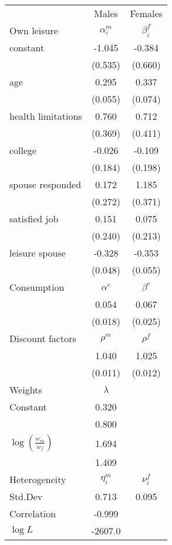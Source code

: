 \begin{tabular}{lcc} 
\hline\hline 
 & Males & Females \\ 
Own leisure & $\alpha_{i}^{m}$ & $\beta_{i}^{f}$ \\ 
constant & -1.045 & -0.384 \\ 
 & (0.535) & (0.660) \\ 
age & 0.295 & 0.337 \\ 
 & (0.055) & (0.074) \\ 
health limitations & 0.760 & 0.712 \\ 
 & (0.369) & (0.411) \\ 
college & -0.026 & -0.109 \\ 
 & (0.184) & (0.198) \\ 
spouse responded & 0.172 & 1.185 \\ 
 & (0.272) & (0.371) \\ 
satisfied job & 0.151 & 0.075 \\ 
 & (0.240) & (0.213) \\ 
leisure spouse & -0.328 & -0.353 \\ 
 & (0.048) & (0.055) \\ 
Consumption & $\alpha^{c}$ & $\beta^{c}$ \\ 
 & 0.054 & 0.067 \\ 
 & (0.018) & (0.025) \\ 
Discount factors & $\rho^m$ & $\rho^f$ \\ 
 & 1.040 & 1.025 \\ 
 & (0.011) & (0.012) \\ 
Weights & $\lambda$ &  \\ 
Constant & 0.320 &  \\ 
 & 0.800 &  \\ 
$\log(\frac{w_m}{w_f})$ & 1.694 &  \\ 
 & 1.409 &  \\ 
Heterogeneity & $\eta_i^m$ & $\nu_i^f$ \\ 
Std.Dev & 0.713 & 0.095 \\ 
Correlation & -0.999 &  \\ 
\hline 
$\log L$ & -2607.0 & \\ 
\hline \hline 
\end{tabular} 
